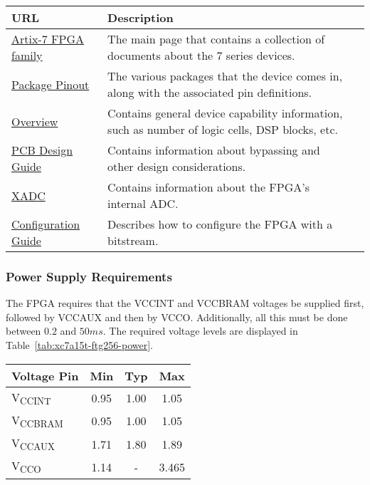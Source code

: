 \label{tab:xc7a15t-ftg256-documents}
\begin{tabularx}{\textwidth}{l X>{\raggedright\arraybackslash}X}
        \caption{Important documents.} \\
        \toprule
        \textbf{URL} & \textbf{Description} \\
        \midrule
        \href{https://www.xilinx.com/products/silicon-devices/fpga/artix-7.html?resultsTablePreSelect=documenttype:Data\%20Sheets\#documentation}{Artix-7
          FPGA family} & The main page that contains a collection of documents about the 7 series
        devices. \\
        \href{https://www.xilinx.com/support/documentation/user_guides/ug475_7Series_Pkg_Pinout.pdf}{Package
          Pinout} & The various packages that the device comes in, along with the associated pin
        definitions. \\
        \href{https://www.xilinx.com/support/documentation/data_sheets/ds180_7Series_Overview.pdf}{Overview}
        & Contains general device capability information, such as number of logic cells, DSP blocks,
        etc. \\
        \href{https://www.xilinx.com/support/documentation/user_guides/ug483_7Series_PCB.pdf}{PCB
          Design Guide} &
        Contains information about bypassing and other design considerations. \\
        \href{https://www.xilinx.com/support/documentation/user_guides/ug480_7Series_XADC.pdf}{XADC}
        & Contains information about the FPGA's internal ADC\@. \\
        \href{https://www.xilinx.com/support/documentation/user_guides/ug470_7Series_Config.pdf}{Configuration
          Guide} & Describes how to configure the FPGA with a bitstream. \\
        \bottomrule
\end{tabularx}

\subsubsection{Power Supply Requirements}
\label{sec:xc7a15t-ftg256-power}

The FPGA requires that the VCCINT and VCCBRAM voltages be supplied first, followed by VCCAUX and
then by VCCO\@. Additionally, all this must be done between $0.2$ and $50 \si{ms}$. The required
voltage levels are displayed in Table~\ref{tab:xc7a15t-ftg256-power}.

\label{tab:xc7a15t-ftg256-power}
\begin{tabularx}{\textwidth}{l c c c}
        \caption{XC7A15T-FTG256 power supply requirements.} \\
        \toprule
        Voltage Pin & Min & Typ & Max \\
        \midrule
        V\textsubscript{CCINT} & 0.95 & 1.00 & 1.05 \\
        V\textsubscript{CCBRAM} & 0.95 & 1.00 & 1.05 \\
        V\textsubscript{CCAUX} & 1.71 & 1.80 & 1.89 \\
        V\textsubscript{CCO} & 1.14 & - & 3.465 \\
        \bottomrule
\end{tabularx}

